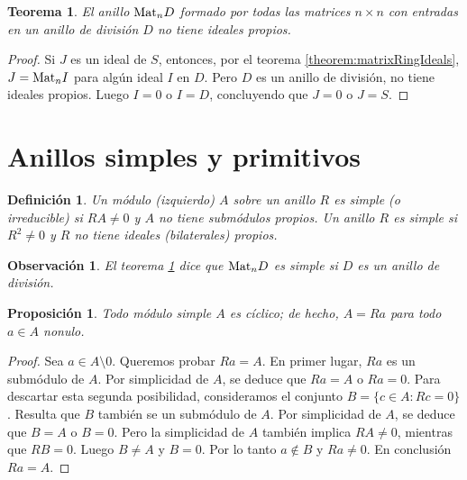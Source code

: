 \documentclass{report}
\newcommand{\Mat}{\textnormal{Mat}}
\newtheorem{theorem}{Teorema}
\newtheorem{proposition}{Proposición}
\newtheorem{definition}{Definición}
\newtheorem{remark}{Observación}
\begin{document}
  \begin{theorem}
    \label{theorem:idealsInTheRingOfMatricesOverADivisionRing}
    El anillo \(\Mat_n D\) formado por todas las matrices \(n \times n\) con entradas en un anillo de división \(D\) no tiene ideales propios.
  \end{theorem}
  \begin{proof}
    Si \(J\) es un ideal de \(S\), entonces, por el teorema \ref{theorem:matrixRingIdeals}, \(J = \Mat_n I\) para algún ideal \(I\) en \(D\).
    Pero \(D\) es un anillo de división, no tiene ideales propios.
    Luego \(I = 0\) o \(I = D\), concluyendo que \(J = 0\) o \(J = S\).
  \end{proof}

  \section{Anillos simples y primitivos}

  \begin{definition}
    Un módulo (izquierdo) \(A\) sobre un anillo \(R\) es \emph{simple} (o \emph{irreducible}) si \(R A \neq 0\) y \(A\) no tiene submódulos propios.
    Un anillo \(R\) es \emph{simple} si \(R^2 \neq 0\) y \(R\) no tiene ideales (bilaterales) propios.
  \end{definition}

  \begin{remark}
    El teorema \ref{theorem:idealsInTheRingOfMatricesOverADivisionRing} dice que \(\Mat_n D\) es simple si \(D\) es un anillo de división.
  \end{remark}

  \begin{proposition}
    Todo módulo simple \(A\) es cíclico; de hecho, \(A = R a\) para todo \(a \in A\) nonulo.
  \end{proposition}
  \begin{proof}
    Sea \(a \in A \setminus 0\).
    Queremos probar \(R a = A\).
    En primer lugar, \(R a\) es un submódulo de \(A\).
    Por simplicidad de \(A\), se deduce que \(R a = A\) o \(R a = 0\).
    Para descartar esta segunda posibilidad, consideramos el conjunto \(B = \{c \in A : R c = 0\}\).
    Resulta que \(B\) también se un submódulo de \(A\).
    Por simplicidad de \(A\), se deduce que \(B = A\) o \(B = 0\).
    Pero la simplicidad de \(A\) también implica \(R A \neq 0\), mientras que \(R B = 0\).
    Luego \(B \neq A\) y \(B = 0\).
    Por lo tanto \(a \notin B\) y \(R a \neq 0\).
    En conclusión \(R a = A\).
  \end{proof}
\end{document}
